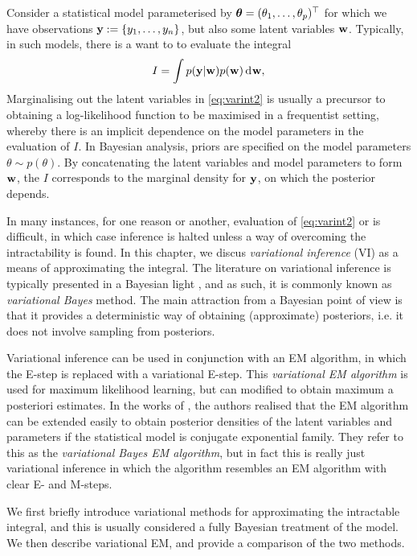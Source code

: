 Consider a statistical model parameterised by ${\bm\theta} = (\theta_1,\dots,\theta_p)^\top$ for which we have observations ${\mathbf y} := \{y_1,\dots,y_n\}$, but also some latent variables ${\mathbf w}$.
Typically, in such models, there is a want to to evaluate the integral 
\begin{equation}\label{eq:varint2} 
  I = \int p({\mathbf y}|{\mathbf w}) p({\mathbf w}) \operatorname{d}\hspace{0.5pt}\! {\mathbf w},
\end{equation}
Marginalising out the latent variables in \cref{eq:varint2} is usually a precursor to obtaining a log-likelihood function to be maximised in a frequentist setting, whereby there is an implicit dependence on the model parameters in the evaluation of $I$.
In Bayesian analysis, priors are specified on the model parameters $\theta\sim p(\theta)$.
By concatenating the latent variables and model parameters to form ${\mathbf w}$, the $I$ corresponds to the marginal density for ${\mathbf y}$, on which the posterior depends.

In many instances, for one reason or another, evaluation of \cref{eq:varint2} or is difficult, in which case inference is halted unless a way of overcoming the intractability is found.
In this chapter, we discus \emph{variational inference} (VI) as a means of approximating the integral.
The literature on variational inference is typically presented in a Bayesian light \citep{jordan1999introduction,bishop2006pattern,blei2017variational}, and as such, it is commonly known as \emph{variational Bayes} method.
The main attraction from a Bayesian point of view is that it provides a deterministic way of obtaining (approximate) posteriors, i.e. it does not involve sampling from posteriors.

Variational inference can be used in conjunction with an EM algorithm, in which the E-step is replaced with a variational E-step.
This \emph{variational EM algorithm} is used for maximum likelihood learning, but can modified to obtain maximum a posteriori estimates.
In the works of \citep{beal2003variational,beal2003}, the authors realised that the EM algorithm can be extended easily to obtain posterior densities of the latent variables and parameters if the statistical model is conjugate exponential family.
They refer to this as the \emph{variational Bayes EM algorithm}, but in fact this is really just variational inference in which the algorithm resembles an EM algorithm with clear E- and M-steps.

We first briefly introduce variational methods for approximating the intractable integral, and this is usually considered a fully Bayesian treatment of the model.
We then describe variational EM, and provide a comparison of the two methods.

